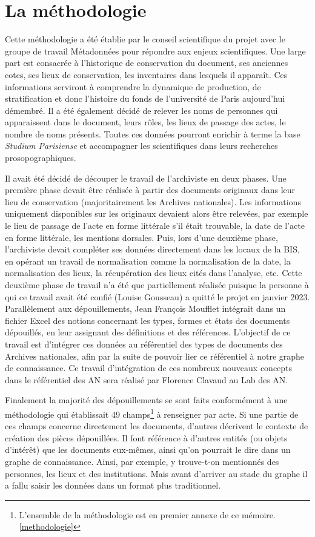 \section{La méthodologie}
Cette méthodologie a été établie par le conseil scientifique du projet avec le groupe de travail Métadonnées pour répondre aux enjeux scientifiques. Une large part est consacrée à l'historique de conservation du document, ses anciennes cotes, ses lieux de conservation, les inventaires dans lesquels il apparaît. Ces informations serviront à comprendre la dynamique de production, de stratification et donc l'histoire du fonds de l'université de Paris aujourd'hui démembré. Il a été également décidé de relever les noms de personnes qui apparaissent dans le document, leurs rôles, les lieux de passage des actes, le nombre de noms présents. Toutes ces données pourront enrichir à terme la base \textit{Studium Parisiense} et accompagner les scientifiques dans leurs recherches prosopographiques.
\par
Il avait été décidé de découper le travail de l'archiviste en deux phases. Une première phase devait être réalisée à partir des documents originaux dans leur lieu de conservation (majoritairement les Archives nationales). Les informations uniquement disponibles sur les originaux devaient alors être relevées, par exemple le lieu de passage de l'acte en forme littérale s'il était trouvable, la date de l'acte en forme littérale, les mentions dorsales. Puis, lors d'une deuxième phase, l'archiviste devait compléter ses données directement dans les locaux de la BIS, en opérant un travail de normalisation comme la normalisation de la date, la normalisation des lieux, la récupération des lieux cités dans l'analyse, etc. Cette deuxième phase de travail n'a été que partiellement réalisée puisque la personne à qui ce travail avait été confié (Louise Gousseau) a quitté le projet en janvier 2023. Parallèlement aux dépouillements, Jean François Moufflet intégrait dans un fichier Excel des notions concernant les types, formes et états des documents dépouillés, en leur assignant des définitions et des références. L'objectif de ce travail est d'intégrer ces données au référentiel des types de documents des Archives nationales, afin par la suite de pouvoir lier ce référentiel à notre graphe de connaissance. Ce travail d'intégration de ces nombreux nouveaux concepts dans le référentiel des AN sera réalisé par Florence Clavaud au Lab des AN.
\par
Finalement la majorité des dépouillements se sont faits conformément à une méthodologie qui établissait 49 champs\footnote{L'ensemble de la méthodologie est en premier annexe de ce mémoire.\ref{methodologie}} à renseigner par acte. Si une partie de ces champs concerne directement les documents, d'autres décrivent le contexte de création des pièces dépouillées. Il font référence à d'autres entités (ou objets d'intérêt) que les documents eux-mêmes, ainsi qu'on pourrait le dire dans un graphe de connaissance. Ainsi, par exemple, y trouve-t-on mentionnés des personnes, les lieux et des institutions. Mais avant d'arriver au stade du graphe il a fallu saisir les données dans un format plus traditionnel.

